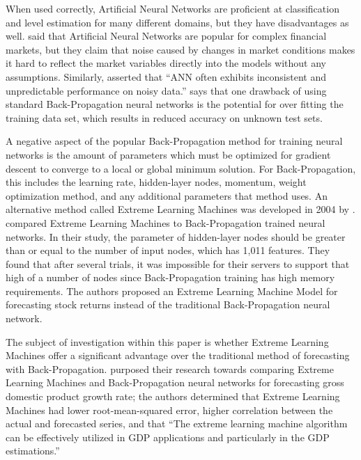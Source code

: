 \documentclass{ncjms}
\begin{document}
	When used correctly, Artificial Neural Networks are proficient at classification and level estimation for many different domains, but they have disadvantages as well.
	\citet{Guresen:2008} said that Artificial Neural Networks are popular for complex financial markets, but they claim that noise caused by changes in market conditions makes it hard to reflect the market variables directly into the models without any assumptions.
	Similarly, \citet{Kim:2003} asserted that ``ANN often exhibits inconsistent and unpredictable performance on noisy data.''
	\citet{Ticknor:2013} says that one drawback of using standard Back-Propagation neural networks is the potential for over fitting the training data set, which results in reduced accuracy on unknown test sets.

	A negative aspect of the popular Back-Propagation method for training neural networks is the amount of parameters which must be optimized for gradient descent to converge to a local or global minimum solution.
	For Back-Propagation, this includes the learning rate, hidden-layer nodes, momentum, weight optimization method, and any additional parameters that method uses.
	An alternative method called Extreme Learning Machines was developed in 2004 by \citet{Guang:2004}.
	\citet{Li:2016} compared Extreme Learning Machines to Back-Propagation trained neural networks.
	In their study, the parameter of hidden-layer nodes should be greater than or equal to the number of input nodes, which has 1,011 features.
	They found that after several trials, it was impossible for their servers to support that high of a number of nodes since Back-Propagation training has high memory requirements.
	The authors proposed an Extreme Learning Machine Model for forecasting stock returns instead of the traditional Back-Propagation neural network.

	The subject of investigation within this paper is whether Extreme Learning Machines offer a significant advantage over the traditional method of forecasting with Back-Propagation.
	\citet{Milacic:2017} purposed their research towards comparing Extreme Learning Machines and Back-Propagation neural networks for forecasting gross domestic product growth rate; the authors determined that Extreme Learning Machines had lower root-mean-squared error, higher correlation between the actual and forecasted series, and that ``The extreme learning machine algorithm can be effectively utilized in GDP applications and particularly in the GDP estimations.''
\end{document}
